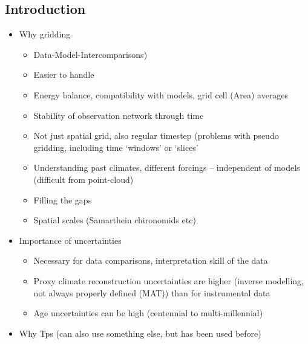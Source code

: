 

\label{chp:gridding}

\begin{refsection}


\section{Introduction}  \label{sec:gridding-intro}

\begin{itemize}
	\item Why gridding
	\begin{itemize}
		\item Data-Model-Intercomparisons)
		\item Easier to handle
		\item Energy balance, compatibility with models, grid cell (Area) averages
		\item Stability of observation network through time
		\item Not just spatial grid, also regular timestep (problems with pseudo gridding, including time ‘windows’ or ‘slices’
		\item Understanding past climates, different forcings – independent of models (difficult from point-cloud)
		\item Filling the gaps
		\item Spatial scales (Samarthein chironomids etc)
	\end{itemize}
	\item Importance of uncertainties
	\begin{itemize}
		\item Necessary for data comparisons, interpretation skill of the data
		\item Proxy climate reconstruction uncertainties are higher (inverse modelling, not always properly defined (MAT)) than for instrumental data
		\item Age uncertainties can be high (centennial to multi-millennial)
	\end{itemize}
	\item Why Tps (can also use something else, but has been used before)
	\begin{itemize}

\end{itemize}
\end{itemize}
\end{refsection}
